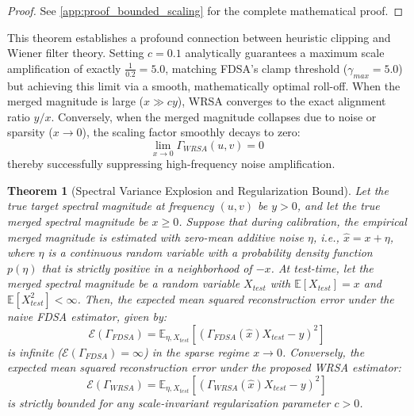 \documentclass{article}
\theoremstyle{plain}
\newtheorem{theorem}{Theorem}[section]
\theoremstyle{definition}
\theoremstyle{remark}
\begin{document}
\begin{proof}
  See \cref{app:proof_bounded_scaling} for the complete mathematical proof.
\end{proof}

This theorem establishes a profound connection between heuristic clipping and Wiener filter theory. Setting $c = 0.1$ analytically guarantees a maximum scale amplification of exactly $\frac{1}{0.2} = 5.0$, matching FDSA's clamp threshold ($\gamma_{max} = 5.0$) but achieving this limit via a smooth, mathematically optimal roll-off. When the merged magnitude is large ($x \gg c y$), WRSA converges to the exact alignment ratio $y/x$. Conversely, when the merged magnitude collapses due to noise or sparsity ($x \to 0$), the scaling factor smoothly decays to zero:
\begin{equation}
  \lim_{x \to 0} \Gamma_{WRSA}(u, v) = 0
\end{equation}
thereby successfully suppressing high-frequency noise amplification.

\begin{theorem}[Spectral Variance Explosion and Regularization Bound]
  Let the true target spectral magnitude at frequency $(u, v)$ be $y > 0$, and let the true merged spectral magnitude be $x \ge 0$. Suppose that during calibration, the empirical merged magnitude is estimated with zero-mean additive noise $\eta$, i.e., $\hat{x} = x + \eta$, where $\eta$ is a continuous random variable with a probability density function $p(\eta)$ that is strictly positive in a neighborhood of $-x$.
  At test-time, let the merged spectral magnitude be a random variable $X_{test}$ with $\mathbb{E}[X_{test}] = x$ and $\mathbb{E}[X_{test}^2] < \infty$.
  Then, the expected mean squared reconstruction error under the naive FDSA estimator, given by:
  \begin{equation}
    \mathcal{E}(\Gamma_{FDSA}) = \mathbb{E}_{\eta, X_{test}} \left[ \left( \Gamma_{FDSA}(\hat{x}) X_{test} - y \right)^2 \right]
  \end{equation}
  is infinite ($\mathcal{E}(\Gamma_{FDSA}) = \infty$) in the sparse regime $x \to 0$. Conversely, the expected mean squared reconstruction error under the proposed WRSA estimator:
  \begin{equation}
    \mathcal{E}(\Gamma_{WRSA}) = \mathbb{E}_{\eta, X_{test}} \left[ \left( \Gamma_{WRSA}(\hat{x}) X_{test} - y \right)^2 \right]
  \end{equation}
  is strictly bounded for any scale-invariant regularization parameter $c > 0$.
\end{theorem}
\end{document}
